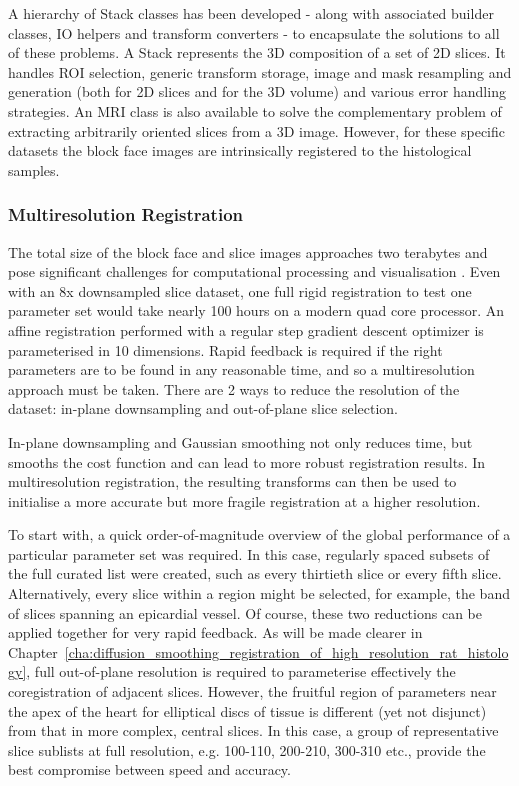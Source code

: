       A hierarchy of Stack classes has been developed - along with associated builder classes, IO helpers and transform converters - to encapsulate the solutions to all of these problems. A Stack represents the 3D composition of a set of 2D slices. It handles ROI selection, generic transform storage, image and mask resampling and generation (both for 2D slices and for the 3D volume) and various error handling strategies. An MRI class is also available to solve the complementary problem of extracting arbitrarily oriented slices from a 3D image. However, for these specific datasets the block face images are intrinsically registered to the histological samples.
    
    \subsubsection{Multiresolution Registration} %
    \label{ssub:multiresolution_registration}
			The total size of the block face and slice images approaches two terabytes \cite{Gibb2012} and pose significant challenges for computational processing and visualisation \cite{Goodyer2009}. Even with an 8x downsampled slice dataset, one full rigid registration to test one parameter set would take nearly 100 hours on a modern quad core processor. An affine registration performed with a regular step gradient descent optimizer is parameterised in 10 dimensions. Rapid feedback is required if the right parameters are to be found in any reasonable time, and so a multiresolution approach must be taken. There are 2 ways to reduce the resolution of the dataset: in-plane downsampling and out-of-plane slice selection.
			
      In-plane downsampling and Gaussian smoothing not only reduces time, but smooths the cost function and can lead to more robust registration results. In multiresolution registration, the resulting transforms can then be used to initialise a more accurate but more fragile registration at a higher resolution.
			
      To start with, a quick order-of-magnitude overview of the global performance of a particular parameter set was required. In this case, regularly spaced subsets of the full curated list were created, such as every thirtieth slice or every fifth slice. Alternatively, every slice within a region might be selected, for example, the band of slices spanning an epicardial vessel. Of course, these two reductions can be applied together for very rapid feedback. As will be made clearer in Chapter~\ref{cha:diffusion_smoothing_registration_of_high_resolution_rat_histology}, full out-of-plane resolution is required to parameterise effectively the coregistration of adjacent slices. However, the fruitful region of parameters near the apex of the heart for elliptical discs of tissue is different (yet not disjunct) from that in more complex, central slices. In this case, a group of representative slice sublists at full resolution, e.g. 100-110, 200-210, 300-310 etc., provide the best compromise between speed and accuracy.
			
